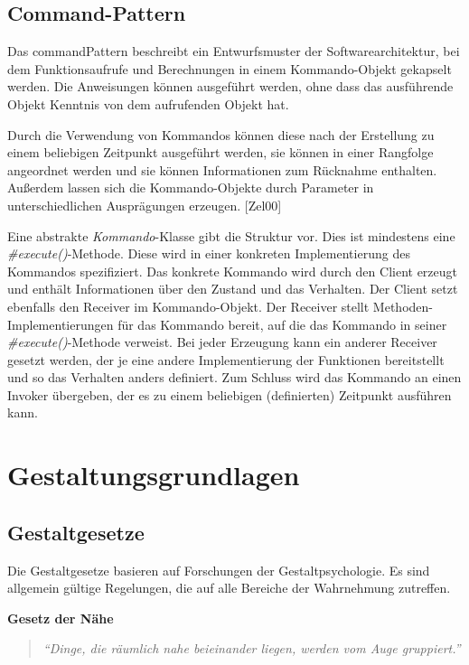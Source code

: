 \subsection{Command-Pattern} \label{sec:patternCommand}
Das \gls{commandPattern} beschreibt ein Entwurfsmuster der Softwarearchitektur, bei dem Funktionsaufrufe und Berechnungen in einem Kommando-Objekt gekapselt werden. Die Anweisungen können ausgeführt werden, ohne dass das ausführende Objekt Kenntnis von dem aufrufenden Objekt hat. \cite{Command}

Durch die Verwendung von Kommandos können diese nach der Erstellung zu einem beliebigen Zeitpunkt ausgeführt werden, sie können in einer Rangfolge angeordnet werden und sie können Informationen zum Rücknahme enthalten. Außerdem lassen sich die Kommando-Objekte durch Parameter in unterschiedlichen Ausprägungen erzeugen. [Zel00]

Eine abstrakte \textit{Kommando}-Klasse gibt die Struktur vor. Dies ist mindestens eine \textit{\#execute()}-Methode. Diese wird in einer konkreten Implementierung des Kommandos spezifiziert. \cite{Command}
Das konkrete Kommando wird durch den Client erzeugt und enthält Informationen über den Zustand und das Verhalten. Der Client setzt ebenfalls den Receiver im Kommando-Objekt. Der Receiver stellt Methoden-Implementierungen für das Kommando bereit, auf die das Kommando in seiner \textit{\#execute()}-Methode verweist. Bei jeder Erzeugung kann ein anderer Receiver gesetzt werden, der je eine andere Implementierung der Funktionen bereitstellt und so das Verhalten anders definiert. Zum Schluss wird das Kommando an einen Invoker übergeben, der es zu einem beliebigen (definierten) Zeitpunkt ausführen kann. \cite{Command}

\section{Gestaltungsgrundlagen} \label{sec:grundGestalt}
\subsection{Gestaltgesetze} \label{sec:gestaltGesetze}
Die Gestaltgesetze basieren auf Forschungen der Gestaltpsychologie. Es sind allgemein gültige Regelungen, die auf alle Bereiche der Wahrnehmung zutreffen.

\textbf{Gesetz der Nähe}

\begin{quote}
\textit{\enquote{Dinge, die räumlich nahe beieinander liegen, werden vom Auge gruppiert.}}
\end{quote} \cite[S. 185]{Moser2012}

